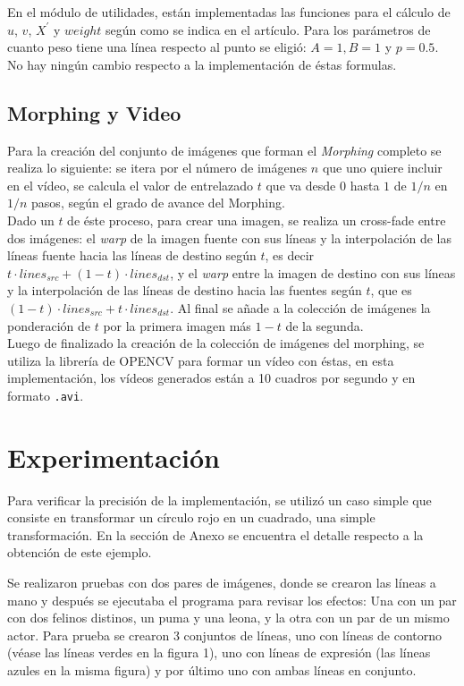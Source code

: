 \documentclass[conference]{IEEEtran}
\begin{document}
		En el módulo de utilidades, están implementadas las funciones para el cálculo de $u$, $v$, $X^\prime$ y $weight$ según como se indica en el artículo.	Para los parámetros de cuanto peso tiene una línea respecto al punto se eligió: $A = 1, B = 1 $ y $ p= 0.5$. No hay ningún cambio respecto a la implementación de éstas formulas.
		
	
	\subsection*{Morphing y Video}
	Para la creación del conjunto de imágenes que forman el \textit{Morphing} completo se realiza lo siguiente: se itera por el número de imágenes $n$ que uno quiere incluir en el vídeo, se calcula el valor de entrelazado $t$ que va desde $0$ hasta $1$ de $1/n$ en $1/n$ pasos, según el grado de avance del Morphing. \\
	Dado un $t$ de éste proceso, para crear una imagen, se realiza un cross-fade entre dos imágenes: el \textit{warp} de la imagen fuente con sus líneas y la interpolación de las líneas fuente hacia las líneas de destino según $t$, es decir $t \cdot lines_{src} + (1 - t) \cdot lines_{dst}$, y el \textit{warp} entre la imagen de destino con sus líneas y la interpolación de las líneas de destino hacia las fuentes según $t$, que es $(1 - t) \cdot lines_{src} + t \cdot lines_{dst}$. Al final se añade a la colección de imágenes la ponderación de $t$ por la primera imagen más $1 - t$ de la segunda. \\
	
	Luego de finalizado la creación de la colección de imágenes del morphing, se utiliza la librería de OPENCV para formar un vídeo con éstas, en esta implementación, los vídeos generados están a 10 cuadros por segundo y en formato \texttt{.avi}.


\section*{Experimentación}
	Para verificar la precisión de la implementación, se utilizó un caso simple que consiste en transformar un círculo rojo en un cuadrado, una simple transformación. En la sección de Anexo se encuentra el detalle respecto a la obtención de este ejemplo.

	Se realizaron pruebas con dos pares de imágenes, donde se crearon las líneas a mano y después se ejecutaba el programa para revisar los efectos: Una con un par con dos felinos distinos, un puma y una leona, y la otra con un par de un mismo actor. Para prueba se crearon 3 conjuntos de líneas, uno con líneas de contorno (véase las líneas verdes en la figura 1), uno con líneas de expresión (las líneas azules en la misma figura) y por último uno con ambas líneas en conjunto.
	
\end{document}
